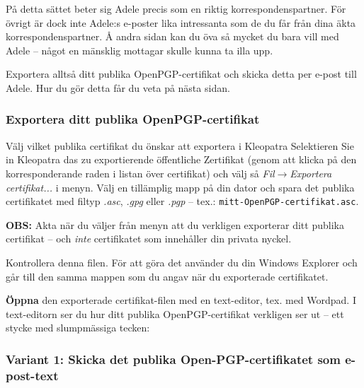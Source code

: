 \documentclass[a4paper,11pt, oneside,openright,titlepage,dvips]{scrbook}
\newcommand{\Menu}[1]{\emph{#1}}
\newcommand{\Filename}[1]{\texttt{#1}}
\newcommand{\IncludeImage}[2][]{\texorhtml{%
\texttt{[image: \#2]}%
}{%
\htmlimg{#2.png}%
}}
\newcounter{part}
\newcounter{chapter}
\newcounter{section}[chapter]
\begin{document}
På detta sättet beter sig Adele precis som en riktig korrespondenspartner.
För övrigt är dock inte Adele:s e-poster lika intressanta som de du får
från dina äkta korrespondenspartner. Å andra sidan kan du öva så mycket
du bara vill med Adele -- något en mänsklig mottagar skulle kunna ta
illa upp.

Exportera alltså ditt publika OpenPGP-certifikat och skicka detta per
e-post till Adele. Hur du gör detta får du veta på nästa sidan.


\clearpage
\subsubsection{Exportera ditt publika OpenPGP-certifikat}

Välj vilket publika certifikat du önskar att exportera i Kleopatra
Selektieren Sie in Kleopatra das zu exportierende öffentliche Zertifikat
(genom att klicka på den korresponderande raden i listan över
certifikat) och välj så
\Menu{Fil$\rightarrow$Exportera certifikat...} i menyn.
Välj en tillämplig mapp på din dator och spara det publika
certifikatet med filtyp \textit{.asc},
\textit{.gpg} eller \textit{.pgp} --
tex.: \Filename{mitt-OpenPGP-certifikat.asc}.

\textbf{OBS:} Akta när du väljer från menyn att du verkligen
exporterar ditt publika certifikat
-- och \textit{inte} certifikatet som innehåller
din privata nyckel.



Kontrollera denna filen. För att göra det använder du din Windows
Explorer och går till den samma mappen som du angav när du
exporterade certifikatet.

\textbf{Öppna} den exporterade certifikat-filen med en text-editor,
tex. med Wordpad. I text-editorn ser du hur ditt publika OpenPGP-certifikat
verkligen ser ut -- ett stycke med slumpmässiga tecken:

\begin{center}
\IncludeImage[width=0.6\textwidth]{sc-wordpad-editOpenpgpKey_de}
\end{center}


\clearpage

\subsubsection{Variant 1: Skicka det publika Open-PGP-certifikatet som
e-post-text}
\end{document}
